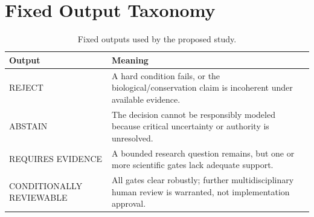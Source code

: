 \documentclass[conference]{IEEEtran}
\begin{document}
\section{Fixed Output Taxonomy}

\begin{table}[t]
\caption{Fixed outputs used by the proposed study.}
\label{tab:outputs}
\centering
\footnotesize
\begin{tabular}{p{} p{}}
\toprule
\textbf{Output} & \textbf{Meaning} \\
\midrule
REJECT & A hard condition fails, or the biological/conservation claim is incoherent under available evidence. \\
ABSTAIN & The decision cannot be responsibly modeled because critical uncertainty or authority is unresolved. \\
REQUIRES EVIDENCE & A bounded research question remains, but one or more scientific gates lack adequate support. \\
CONDITIONALLY REVIEWABLE & All gates clear robustly; further multidisciplinary human review is warranted, not implementation approval. \\
\bottomrule
\end{tabular}
\end{table}
\end{document}
